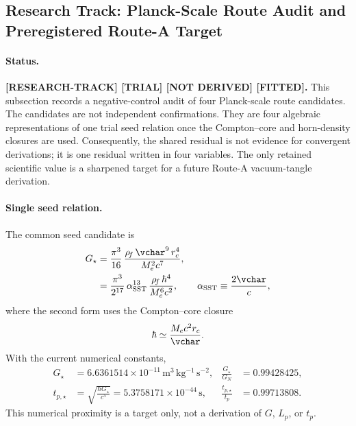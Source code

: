 

\subsection{Research Track: Planck-Scale Route Audit and Preregistered Route-A Target}
\label{subsec:rt_planck_routes_v3_preregistered_audit}

\paragraph{Status.}
\textbf{[RESEARCH-TRACK] [TRIAL] [NOT DERIVED] [FITTED].}
This subsection records a negative-control audit of four Planck-scale route
candidates.  The candidates are not independent confirmations.  They are four
algebraic representations of one trial seed relation once the Compton--core and
horn-density closures are used.  Consequently, the shared residual is not
evidence for convergent derivations; it is one residual written in four
variables.  The only retained scientific value is a sharpened target for a
future Route-A vacuum-tangle derivation.

\paragraph{Single seed relation.}
The common seed candidate is
\begin{align}
    G_{\star}
    &=
    \frac{\pi^3}{16}\,
    \frac{\rho_{\!f}\,\vchar^{9}\,r_c^4}{M_e^2 c^7},
    \label{eq:rt_planck_v3_seed_G}
    \\
    &=
    \frac{\pi^3}{2^{17}}\,
    \alpha_{\rm SST}^{13}\,
    \frac{\rho_{\!f}\,\hbar^4}{M_e^6c^2},
    \qquad
    \alpha_{\rm SST}\equiv\frac{2\vchar}{c},
    \label{eq:rt_planck_v3_seed_alpha_form}
\end{align}
where the second form uses the Compton--core closure
\begin{align}
    \hbar\simeq\frac{M_ec^2r_c}{\vchar}.
\end{align}
With the current numerical constants,
\begin{align}
    G_{\star}
    &=6.6361514\times10^{-11}\,
    \mathrm{m^3\,kg^{-1}\,s^{-2}},
    &
    \frac{G_{\star}}{G_N}&=0.99428425,
    \\
    t_{p,\star}
    &=\sqrt{\frac{\hbar G_{\star}}{c^5}}
    =5.3758171\times10^{-44}\,\mathrm{s},
    &
    \frac{t_{p,\star}}{t_p}&=0.99713808.
\end{align}
This numerical proximity is a target only, not a derivation of
\(G\), \(L_p\), or \(t_p\).

